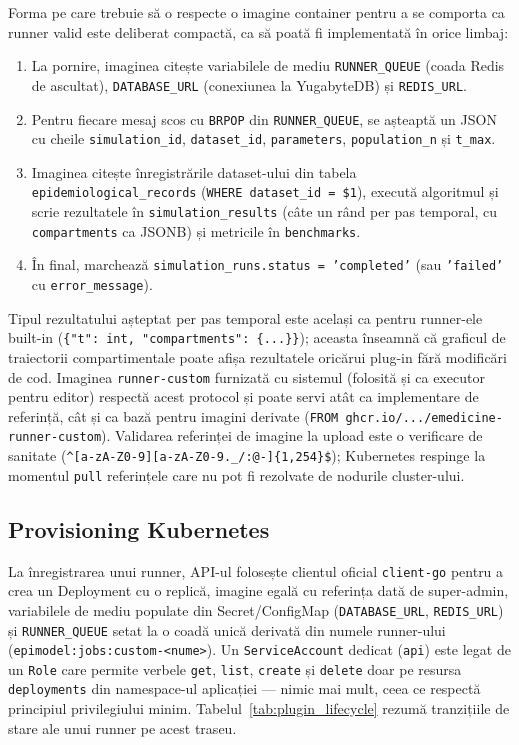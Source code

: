 Forma pe care trebuie să o respecte o imagine container pentru a se comporta ca
runner valid este deliberat compactă, ca să poată fi implementată în orice
limbaj:
\begin{enumerate}
    \item La pornire, imaginea citește variabilele de mediu
          \texttt{RUNNER\_QUEUE} (coada Redis de ascultat), \texttt{DATABASE\_URL}
          (conexiunea la YugabyteDB) și \texttt{REDIS\_URL}.
    \item Pentru fiecare mesaj scos cu \texttt{BRPOP} din \texttt{RUNNER\_QUEUE},
          se așteaptă un JSON cu cheile \texttt{simulation\_id},
          \texttt{dataset\_id}, \texttt{parameters}, \texttt{population\_n} și
          \texttt{t\_max}.
    \item Imaginea citește înregistrările dataset-ului din tabela
          \texttt{epidemiological\_records} (\texttt{WHERE dataset\_id = \$1}),
          execută algoritmul și scrie rezultatele în
          \texttt{simulation\_results} (câte un rând per pas temporal, cu
          \texttt{compartments} ca JSONB) și metricile în \texttt{benchmarks}.
    \item În final, marchează \texttt{simulation\_runs.status = 'completed'}
          (sau \texttt{'failed'} cu \texttt{error\_message}).
\end{enumerate}

Tipul rezultatului așteptat per pas temporal este același ca pentru runner-ele
built-in (\texttt{\{"t": int, "compartments": \{...\}\}}); aceasta înseamnă că
graficul de traiectorii compartimentale poate afișa rezultatele oricărui
plug-in fără modificări de cod. Imaginea \texttt{runner-custom} furnizată cu
sistemul (folosită și ca executor pentru editor) respectă acest protocol și
poate servi atât ca implementare de referință, cât și ca bază pentru imagini
derivate (\texttt{FROM ghcr.io/.../emedicine-runner-custom}). Validarea
referinței de imagine la upload este o verificare de sanitate
(\texttt{\textasciicircum[a-zA-Z0-9][a-zA-Z0-9.\_/:@-]\{1,254\}\$});
Kubernetes respinge la momentul \texttt{pull} referințele care nu pot fi
rezolvate de nodurile cluster-ului.

\subsection{Provisioning Kubernetes}
\label{subsec:plugin_provisioning}

La înregistrarea unui runner, API-ul folosește clientul oficial
\texttt{client-go} pentru a crea un Deployment cu o replică, imagine egală cu
referința dată de super-admin, variabilele de mediu populate din
Secret/ConfigMap (\texttt{DATABASE\_URL}, \texttt{REDIS\_URL}) și
\texttt{RUNNER\_QUEUE} setat la o coadă unică derivată din numele runner-ului
(\texttt{epimodel:jobs:custom-<nume>}). Un \texttt{ServiceAccount} dedicat
(\texttt{api}) este legat de un \texttt{Role} care permite verbele
\texttt{get}, \texttt{list}, \texttt{create} și \texttt{delete} doar pe
resursa \texttt{deployments} din namespace-ul aplicației --- nimic mai mult,
ceea ce respectă principiul privilegiului minim. Tabelul~\ref{tab:plugin_lifecycle}
rezumă tranzițiile de stare ale unui runner pe acest traseu.

